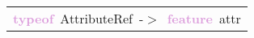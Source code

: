 \begin{tabular}[t]{l}
\noindent
\mbox{}\textbf{\textcolor{Plum}{typeof}}\ AttributeRef\ -$>$\ \textbf{\textcolor{Plum}{feature}}\ attr
\end{tabular}
